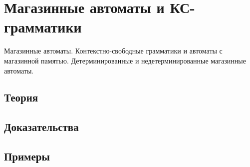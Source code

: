 
\section{Магазинные автоматы и КС-грамматики}
\label{sec:2.3a.09-pushdown-automata}

\begin{ticket}
Магазинные автоматы. Контекстно-свободные грамматики и автоматы с магазинной памятью. Детерминированные и недетерминированные магазинные автоматы.
\end{ticket}

\subsection*{Теория}

\subsection*{Доказательства}

\subsection*{Примеры}
